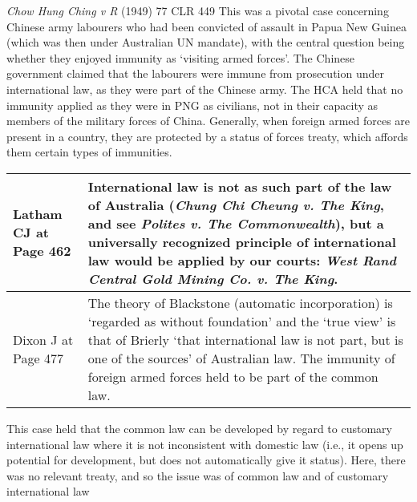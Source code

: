 \begin{casedetails}{\textit{Chow Hung Ching v R} (1949) 77 CLR 449}
    \flushleft
    This was a pivotal case concerning Chinese army labourers who had been convicted of assault in Papua New Guinea (which was then under Australian UN mandate), with the central question being whether they enjoyed immunity as `visiting armed forces'. The Chinese government claimed that the labourers were immune from prosecution under international law, as they were part of the Chinese army. The HCA held that no immunity applied as they were in PNG as civilians, not in their capacity as members of the military forces of China. Generally, when foreign armed forces are present in a country, they are protected by a status of forces treaty, which affords them certain types of immunities. 

    \begin{longtable}{p{}|>{\raggedright\arraybackslash}p{}}
        Latham CJ at Page 462 & International law is not as such part of the law of Australia (\textit{Chung Chi Cheung v. The King}, and see \textit{Polites v. The Commonwealth}), but a universally recognized principle of international law would be applied by our courts: \textit{West Rand Central Gold Mining Co. v. The King}. \\\hline
        Dixon J at Page 477 & The theory of Blackstone (automatic incorporation) is `regarded as without foundation' and the `true view' is that of Brierly `that international law is not part, but is one of the sources' of Australian law. The immunity of foreign armed forces held to be part of the common law.
    \end{longtable}

    This case held that the common law can be developed by regard to customary international law where it is not inconsistent with domestic law (i.e., it opens up potential for development, but does not automatically give it status). Here, there was no relevant treaty, and so the issue was of common law and of customary international law
\end{casedetails}

